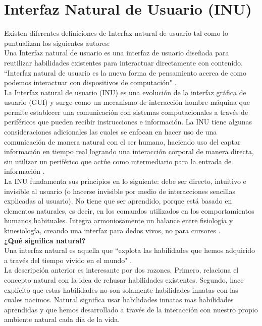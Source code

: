 \section{Interfaz Natural de Usuario (INU)}

Existen diferentes definiciones de Interfaz natural de usuario tal como lo puntualizan los siguientes autores: \\

Una Interfaz natural de usuario es una interfaz de usuario diseñada para reutilizar habilidades existentes para interactuar directamente con contenido. ``Interfaz natural de usuario es la nueva forma de pensamiento acerca de como podemos interactuar con dispositivos de computación" \cite{Blake}. \\

La Interfaz natural de usuario (INU) es una evolución de la interfaz gráfica de usuario (GUI) y surge como un mecanismo de interacción hombre-máquina que permite establecer una  comunicación con sistemas computacionales a través de periféricos que pueden recibir instrucciones e información. La INU tiene algunas consideraciones adicionales las cuales se enfocan en hacer uso de una comunicación de manera natural con el ser humano, haciendo uso del captar información en tiempo real logrando una interacción corporal de manera directa, sin utilizar un periférico que actúe como intermediario para la entrada de información \cite{Gomez}. \\

La INU fundamenta sus principios en lo siguiente: debe ser directo, intuitivo e invisible al usuario (o hacerse invisible por medio de interacciones sencillas explicadas al usuario). No tiene que ser aprendido, porque está basado en elementos naturales, es decir, en los comandos utilizados en los comportamientos humanos habituales. Integra armoniosamente un balance entre fisiología y kinesiología, creando una interfaz para dedos vivos, no para cursores \cite{Sarajevo}. \\

\textbf{¿Qué significa natural?} \\

Una interfaz natural es aquella que ``explota las habilidades que hemos adquirido a través del tiempo vivido en el mundo" \cite{Buxton}. \\

La descripción anterior es interesante por dos razones. Primero, relaciona el concepto natural con la idea de rehusar habilidades existentes. Segundo, hace explícito que estas habilidades no son solamente habilidades innatas con las cuales nacimos. Natural significa usar habilidades innatas mas habilidades aprendidas y que hemos desarrollado a través de la interacción con nuestro propio ambiente natural cada día de la vida. \\

